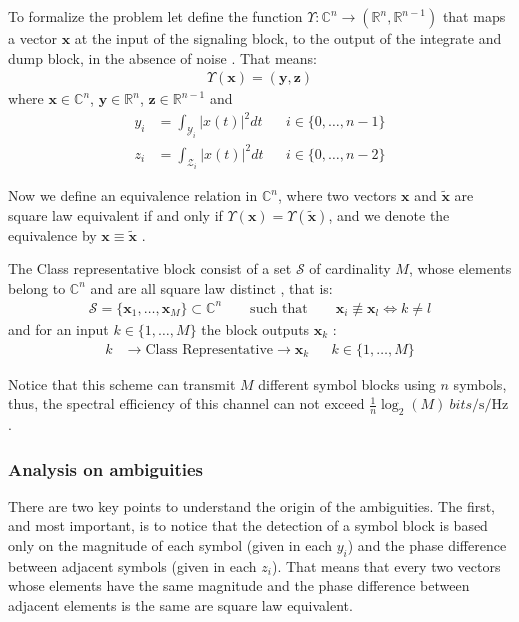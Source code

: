 To formalize the problem let define the function $\Upsilon: \mathds{C}^n\to(\mathds{R}^n,\mathds{R}^{n-1})$ that maps a vector $\bm x$ at the input of the signaling block, to the output of the integrate and dump block, in the absence of noise \cite{Tasbihi_Tukey}. That means:
\begin{align}
	\Upsilon(\bm x) = (\bm y, \bm z)
\end{align}
where $\bm x\in\mathds{C}^n$, $\bm y\in\mathds{R}^n$, $\bm z\in\mathds{R}^{n-1}$ and 
\begin{align}
	y_i&=\int_{\mathcal Y_i}\bigl|x(t)\bigr|^2dt&&i\in \{0,\dotsc,n-1\}\\
	z_i&=\int_{\mathcal Z_i}\bigl|x(t)\bigr|^2dt&&i\in \{0,\dotsc,n-2\}
\end{align}

Now we define an equivalence relation in $\mathds C^n$, where two vectors $\bm x$ and $\bm{\tilde{x}}$ are square law equivalent if and only if $\Upsilon(\bm x)=\Upsilon(\bm{\tilde{x}})$, and we denote the equivalence by $\bm x \equiv \bm{\tilde{x}}$ \cite{Tasbihi_Tukey}.

The Class representative block consist of a set $\mathcal S$ of cardinality $M$, whose elements belong to $\mathds{C}^n$ and are all square law distinct \cite{Tasbihi_Tukey}, that is:
\begin{align}
	\mathcal S = \{\bm x_1, \dotsc,\bm x_M\} \subset\mathds C^n\qquad \text{such that}\qquad\bm x_i\not\equiv\bm x_l \Leftrightarrow k\neq l
\end{align}
and for an input $k\in\{1,\dotsc,M\}$ the block outputs $\bm x_k$ \cite{Tasbihi_Tukey}:
\begin{align}
	k& \longrightarrow\boxed{\text{Class Representative}}\longrightarrow \bm x_k && k\in\{1,\dotsc,M\}
\end{align} 

Notice that this scheme can transmit $M$ different symbol blocks using $n$ symbols, thus, the spectral efficiency of this channel can not exceed $\frac{1}{n}\log_2(M)\SI{}{bits/\s/\Hz}$ \cite{Tasbihi_Tukey}.

\subsubsection{Analysis on ambiguities}
\label{sec:ambiguities}

There are two key points to understand the origin of the ambiguities. The first, and most important, is to notice that the detection of a symbol block is based only on the magnitude of each symbol (given in each $y_i$) and the phase difference between adjacent symbols (given in each $z_i$). That means that every two vectors whose elements have the same magnitude and the phase difference between adjacent elements is the same are square law equivalent.

